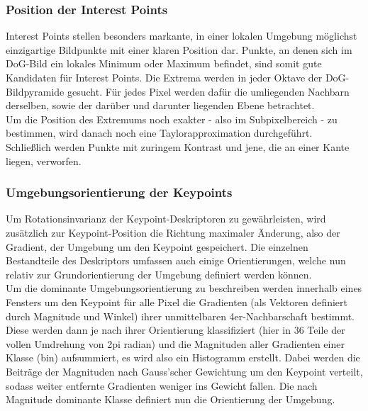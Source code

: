 \documentclass[deutsch]{scrartcl}
\begin{document}
\subsubsection{Position der Interest Points}
Interest Points stellen besonders markante, in einer lokalen Umgebung möglichst einzigartige Bildpunkte mit einer klaren Position dar. Punkte, an denen sich im DoG-Bild ein lokales Minimum oder Maximum befindet, sind somit gute Kandidaten für Interest Points. Die Extrema werden in jeder Oktave der DoG-Bildpyramide gesucht. Für jedes Pixel werden dafür die umliegenden Nachbarn derselben, sowie der darüber und darunter liegenden Ebene betrachtet.\\
Um die Position des Extremums noch exakter - also im Subpixelbereich - zu bestimmen, wird danach noch eine Taylorapproximation durchgeführt.\\
Schließlich werden Punkte mit zuringem Kontrast und jene, die an einer Kante liegen, verworfen.

\subsubsection{Umgebungsorientierung der Keypoints}
Um Rotationsinvarianz der Keypoint-Deskriptoren zu gewährleisten, wird zusätzlich zur Keypoint-Position die Richtung maximaler Änderung, also der Gradient, der Umgebung um den Keypoint gespeichert. Die einzelnen Bestandteile des Deskriptors umfassen auch einige Orientierungen, welche nun relativ zur Grundorientierung der Umgebung definiert werden können.\\
Um die dominante Umgebungsorientierung zu beschreiben werden innerhalb eines Fensters um den Keypoint für alle Pixel die Gradienten (als Vektoren definiert durch Magnitude und Winkel) ihrer unmittelbaren 4er-Nachbarschaft bestimmt. Diese werden dann je nach ihrer Orientierung  klassifiziert (hier in 36 Teile der vollen Umdrehung von 2pi radian) und die Magnituden aller Gradienten einer Klasse (bin) aufsummiert, es wird also ein Histogramm erstellt. Dabei werden die Beiträge der Magnituden nach Gauss'scher Gewichtung um den Keypoint verteilt, sodass weiter entfernte Gradienten weniger ins Gewicht fallen. Die nach Magnitude dominante Klasse definiert nun die Orientierung der Umgebung.\cite{lowe04}
\end{document}
